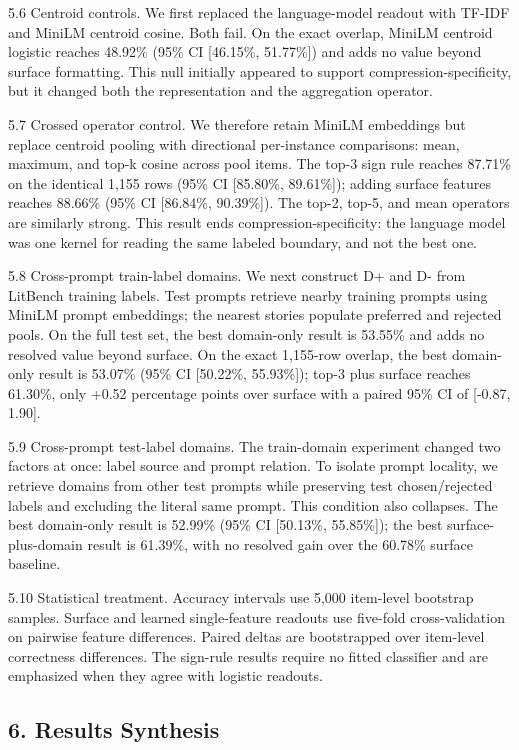 \documentclass[
]{article}
\begin{document}
5.6 Centroid controls. We first replaced the language-model readout with
TF-IDF and MiniLM centroid cosine. Both fail. On the exact overlap,
MiniLM centroid logistic reaches 48.92\% (95\% CI {[}46.15\%,
51.77\%{]}) and adds no value beyond surface formatting. This null
initially appeared to support compression-specificity, but it changed
both the representation and the aggregation operator.

5.7 Crossed operator control. We therefore retain MiniLM embeddings but
replace centroid pooling with directional per-instance comparisons:
mean, maximum, and top-k cosine across pool items. The top-3 sign rule
reaches 87.71\% on the identical 1,155 rows (95\% CI {[}85.80\%,
89.61\%{]}); adding surface features reaches 88.66\% (95\% CI
{[}86.84\%, 90.39\%{]}). The top-2, top-5, and mean operators are
similarly strong. This result ends compression-specificity: the language
model was one kernel for reading the same labeled boundary, and not the
best one.

5.8 Cross-prompt train-label domains. We next construct D+ and D- from
LitBench training labels. Test prompts retrieve nearby training prompts
using MiniLM prompt embeddings; the nearest stories populate preferred
and rejected pools. On the full test set, the best domain-only result is
53.55\% and adds no resolved value beyond surface. On the exact
1,155-row overlap, the best domain-only result is 53.07\% (95\% CI
{[}50.22\%, 55.93\%{]}); top-3 plus surface reaches 61.30\%, only +0.52
percentage points over surface with a paired 95\% CI of {[}-0.87,
1.90{]}.

5.9 Cross-prompt test-label domains. The train-domain experiment changed
two factors at once: label source and prompt relation. To isolate prompt
locality, we retrieve domains from other test prompts while preserving
test chosen/rejected labels and excluding the literal same prompt. This
condition also collapses. The best domain-only result is 52.99\% (95\%
CI {[}50.13\%, 55.85\%{]}); the best surface-plus-domain result is
61.39\%, with no resolved gain over the 60.78\% surface baseline.

5.10 Statistical treatment. Accuracy intervals use 5,000 item-level
bootstrap samples. Surface and learned single-feature readouts use
five-fold cross-validation on pairwise feature differences. Paired
deltas are bootstrapped over item-level correctness differences. The
sign-rule results require no fitted classifier and are emphasized when
they agree with logistic readouts.

\subsection{6. Results Synthesis}\label{results-synthesis}
\end{document}
